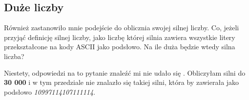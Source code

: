 \documentclass[12pt,a4paper]{article}
\begin{document}
\newpage
\subsection{Duże liczby}

Również zastanowiło mnie podejście do oblicznia swojej silnej liczby. Co, jeżeli przyjąć definicję silnej liczby, jako liczbę której silnia zawiera wszystkie litery przekształcone na kody ASCII jako podsłowo. Na ile duża będzie wtedy silna liczba?

Niestety, odpowiedzi na to pytanie znaleźć mi nie udało się \textcolor{yellow!90!black}{\faFrown}. Obliczyłam silni do \\
\textbf{30 000} i w tym przedziale nie znalazło się takiej silni, która by zawierała jako podsłowo \textit{10997114107111114}. 
\end{document}
